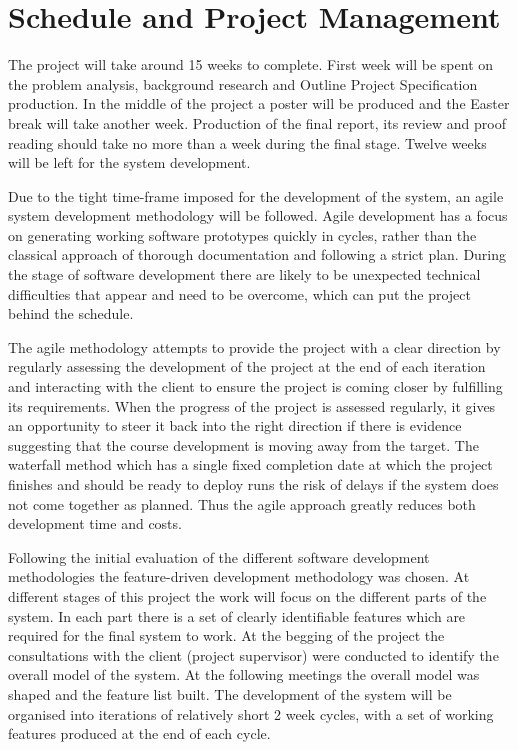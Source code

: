 \section{Schedule and Project Management}
The project will take around 15 weeks to complete. First week will be spent on the problem analysis, background research and Outline Project Specification production. In the middle of the project a poster will be produced and the Easter break will take another week. Production of the final report, its review and proof reading should take no more than a week during the final stage. Twelve weeks will be left for the system development.

Due to the tight time-frame imposed for the development of the system, an agile system development methodology will be followed. Agile development has a focus on generating working software prototypes quickly in cycles, rather than the classical approach of thorough documentation and following a strict plan. During the stage of software development there are likely to be unexpected technical difficulties that appear and need to be overcome, which can put the project behind the schedule.

The agile methodology attempts to provide the project with a clear direction by regularly assessing the development of the project at the end of each iteration and interacting with the client to ensure the project is coming closer by fulfilling its requirements. When the progress of the project is assessed regularly, it gives an opportunity to steer it back into the right direction if there is evidence suggesting that the course development is moving away from the target. The waterfall method which has a single fixed completion date at which the project finishes and should be ready to deploy runs the risk of delays if the system does not come together as planned. Thus the agile approach greatly reduces both development time and costs\cite{AgileManifesto}.

Following the initial evaluation of the different software development methodologies the feature-driven development methodology was chosen. At different stages of this project the work will focus on the different parts of the system. In each part there is a set of clearly identifiable features which are required for the final system to work. At the begging of the project the consultations with the client (project supervisor) were conducted to identify the overall model of the system. At the following meetings the overall model was shaped and the feature list built. The development of the system will be organised into iterations of relatively short 2 week cycles, with a set of working features produced at the end of each cycle.

